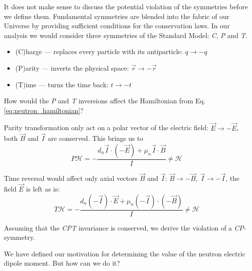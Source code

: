 It does not make sense to discuss the potential violation of the symmetries before we define them.  Fundamental symmetries are blended into the fabric of our Universe by providing sufficient conditions \cite{Noether1918} for the conservation laws. In our analysis we would consider three symmetries of the Standard Model: \textit{C}, \textit{P} and \textit{T}.

\begin{itemize}
	\item (C)harge –-- replaces every particle with its antiparticle: $q \rightarrow -q$
	\item (P)arity --- inverts the physical space: $\vec{r} \rightarrow -\vec{r}$
	\item (T)ime --- turns the time back: $t \rightarrow -t$
\end{itemize}

How would the \textit{P} and \textit{T} inversions affect \cite{Dubbers2011} the Hamiltonian from Eq. \ref{eq:neutron_hamiltonian}?

Parity transformation only act on a polar vector of the electric field: $\vec{E} \rightarrow -\vec{E}$, both $\vec{B}$ and $\vec{I}$ are conserved. This brings us to
\begin{equation}
	\textit{P}\mathcal{H} = -\frac{d_n \vec{I} \cdot \left(-\vec{E}\right) + \mu_n \vec{I} \cdot \vec{B}}{I} \neq \mathcal{H}
	\label{eq:neutron_hamiltonian_P}
\end{equation}

Time reversal would affect only axial vectors $\vec{B}$ and $\vec{I}$: $\vec{B} \rightarrow -\vec{B},\ \vec{I} \rightarrow -\vec{I}$, the field $\vec{E}$ is left as is:
\begin{equation}
	\textit{T}\mathcal{H} = -\frac{d_n \left(-\vec{I}\right) \cdot \vec{E} + \mu_n \left(-\vec{I}\right) \cdot \left( -\vec{B} \right)}{I} \neq \mathcal{H}
	\label{eq:neutron_hamiltonian_T}
\end{equation}

Assuming that the \textit{CPT} invariance \cite{Schwinger1951} is conserved, we derive the violation of a \textit{CP}-symmetry.

We have defined our motivation for determining the value of the neutron electric dipole moment. But how can we do it?



